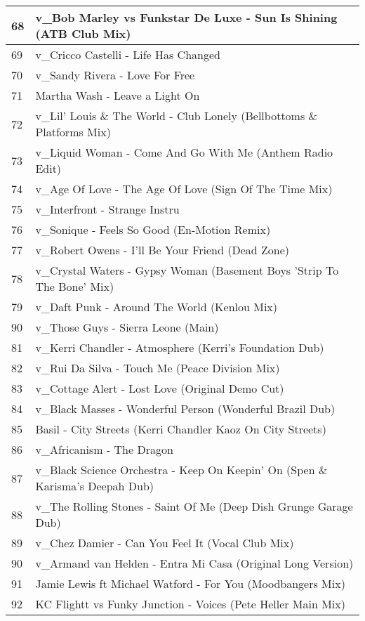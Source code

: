 \begin{appendices}
\begin{longtable}{| p{} | p{} |}
\hline 
68 & v{\_}Bob Marley vs Funkstar De Luxe - Sun Is Shining (ATB Club Mix)\\
\hline
69 & v{\_}Cricco Castelli - Life Has Changed\\
\hline
70 & v{\_}Sandy Rivera - Love For Free\\
\hline
71 & Martha Wash - Leave a Light On\\
\hline
72 & v{\_}Lil' Louis {\&} The World - Club Lonely (Bellbottoms {\&} Platforms Mix)\\
\hline
73 & v{\_}Liquid Woman - Come And Go With Me (Anthem Radio Edit)\\
\hline
74 & v{\_}Age Of Love - The Age Of Love (Sign Of The Time Mix)\\
\hline
75 & v{\_}Interfront - Strange Instru\\
\hline
76 & v{\_}Sonique - Feels So Good (En-Motion Remix)\\
\hline
77 & v{\_}Robert Owens - I'll Be Your Friend (Dead Zone)\\
\hline
78 & v{\_}Crystal Waters - Gypsy Woman (Basement Boys 'Strip To The Bone' Mix)\\
\hline
79 & v{\_}Daft Punk - Around The World (Kenlou Mix)\\
\hline
90 & v{\_}Those Guys - Sierra Leone (Main)\\
\hline
81 & v{\_}Kerri Chandler - Atmosphere (Kerri's Foundation Dub)\\
\hline
82 & v{\_}Rui Da Silva - Touch Me (Peace Division Mix)\\
\hline
83 & v{\_}Cottage Alert - Lost Love (Original Demo Cut)\\
\hline
84 & v{\_}Black Masses - Wonderful Person (Wonderful Brazil Dub)\\
\hline
85 & Basil - City Streets (Kerri Chandler Kaoz On City Streets)\\
\hline
86 & v{\_}Africanism - The Dragon\\
\hline
87 & v{\_}Black Science Orchestra - Keep On Keepin' On (Spen {\&} Karisma's Deepah Dub)\\
\hline
88 & v{\_}The Rolling Stones - Saint Of Me (Deep Dish Grunge Garage Dub)\\
\hline
89 & v{\_}Chez Damier - Can You Feel It (Vocal Club Mix)\\
\hline 
90 & v{\_}Armand van Helden - Entra Mi Casa (Original Long Version)\\
\hline
91 & Jamie Lewis ft Michael Watford - For You (Moodbangers Mix)\\
\hline 
92 & KC Flightt vs Funky Junction - Voices (Pete Heller Main Mix)\\

\end{longtable}
\end{appendices}
